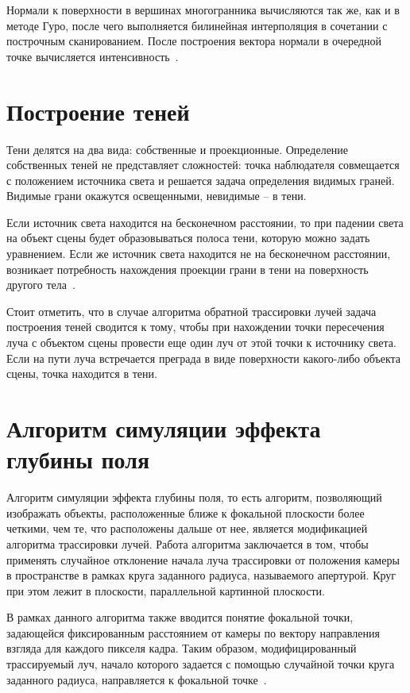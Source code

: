 Нормали к поверхности в вершинах многогранника вычисляются так же, как и в методе Гуро, после чего выполняется билинейная интерполяция в сочетании с построчным сканированием. После построения вектора нормали в очередной точке вычисляется интенсивность~\cite{lit5}.

\section{Построение теней}
Тени делятся на два вида: собственные и проекционные. Определение собственных теней не представляет сложностей: точка наблюдателя совмещается с положением источника света и решается задача определения видимых граней. Видимые грани окажутся освещенными, невидимые -- в тени.

Если источник света находится на бесконечном расстоянии, то при падении света на объект сцены будет образовываться полоса тени, которую можно задать уравнением. Если же источник света находится не на бесконечном расстоянии, возникает потребность нахождения проекции грани в тени на поверхность другого тела~\cite{lit6}.

Стоит отметить, что в случае алгоритма обратной трассировки лучей задача построения теней сводится к тому, чтобы при нахождении точки пересечения луча с объектом сцены провести еще один луч от этой точки к источнику света. Если на пути луча встречается преграда в виде поверхности какого-либо объекта сцены, точка находится в тени.

\section{Алгоритм симуляции эффекта глубины поля}
Алгоритм симуляции эффекта глубины поля, то есть алгоритм, позволяющий изображать объекты, расположенные ближе к фокальной плоскости более четкими, чем те, что расположены дальше от нее, является модификацией алгоритма трассировки лучей. Работа алгоритма заключается в том, чтобы применять случайное отклонение начала луча трассировки от положения камеры в пространстве в рамках круга заданного радиуса, называемого апертурой. Круг при этом лежит в плоскости, параллельной картинной плоскости.

В рамках данного алгоритма также вводится понятие фокальной точки, задающейся фиксированным расстоянием от камеры по вектору направления взгляда для каждого пикселя кадра. Таким образом, модифицированный трассируемый луч, начало которого задается с помощью случайной точки круга заданного радиуса, направляется к фокальной точке~\cite{DOF}.



